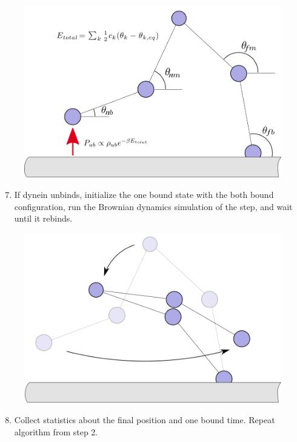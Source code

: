 \begin{figure}[H]
\centering
\includegraphics[width=0.8\columnwidth]{Figures/montecarlo4.png}
\label{fig:mc4}
\end{figure}

\newpage

\begin{enumerate}
	\setcounter{enumi}{6}
	\item If dynein unbinds, initialize the one bound state with the both bound configuration, run the Brownian dynamics simulation of the step, and wait until it rebinds.
\end{enumerate}

\begin{figure}[H]
\centering
\includegraphics[width=0.7\columnwidth]{Figures/montecarlo5.png}
\label{fig:mc4}
\end{figure}

\begin{enumerate}
	\setcounter{enumi}{7}
	\item Collect statistics about the final position and one bound time. Repeat algorithm from step 2. 
\end{enumerate}

